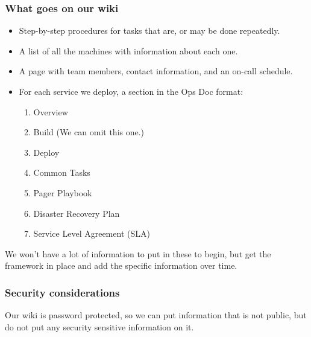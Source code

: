 \documentclass[10pt]{beamer}
\begin{document}
\begin{frame}
  \frametitle{What goes on our wiki}
   
   \begin{itemize}
     \item Step-by-step procedures for tasks that are, or may be done repeatedly.
     \item A list of all the machines with information about each one.
     \item A page with team members, contact information, and an on-call schedule.
     \item For each service we deploy, a section in the Ops Doc format:
       \begin{enumerate}
         \item Overview
         \item Build (We can omit this one.)
         \item Deploy
         \item Common Tasks
         \item Pager Playbook
         \item Disaster Recovery Plan
         \item Service Level Agreement (SLA)
         \end{enumerate}
   \end{itemize}
  
  We won't have a lot of information to put in these to begin, but get the framework in place
  and add the specific information over time.
  
  
\end{frame}

\begin{frame}
  \frametitle{Security considerations}
   
   Our wiki is password protected, so we can put information that is not public, 
   but do not put any security sensitive information on it.
  
  
\end{frame}
\end{document}
